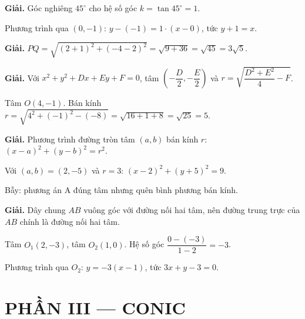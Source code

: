 \documentclass[11pt, a4paper]{article}
\begin{document}
\vspace{0.3cm}
\begin{dapan}[17 — Đáp án B]

\textbf{Giải.} Góc nghiêng $45^\circ$ cho hệ số góc $k = \tan 45^\circ = 1$.

Phương trình qua $(0,-1)$: $y - (-1) = 1 \cdot (x - 0)$, tức $y + 1 = x$.


\end{dapan}
\vspace{0.3cm}
\begin{dapan}[18 — Đáp án A]

\textbf{Giải.} $PQ = \sqrt{(2+1)^2 + (-4-2)^2} = \sqrt{9 + 36} = \sqrt{45} = 3\sqrt{5}$.


\end{dapan}
\vspace{0.3cm}
\begin{dapan}[19 — Đáp án A]

\textbf{Giải.} Với $x^2+y^2+Dx+Ey+F=0$, tâm $\left(-\dfrac{D}{2}, -\dfrac{E}{2}\right)$ và $r = \sqrt{\dfrac{D^2+E^2}{4} - F}$.

Tâm $O(4,-1)$. Bán kính $r = \sqrt{4^2 + (-1)^2 - (-8)} = \sqrt{16+1+8} = \sqrt{25} = 5$.


\end{dapan}
\vspace{0.3cm}
\begin{dapan}[20 — Đáp án C]

\textbf{Giải.} Phương trình đường tròn tâm $(a,b)$ bán kính $r$: $(x-a)^2 + (y-b)^2 = r^2$.

Với $(a,b) = (2,-5)$ và $r = 3$: $(x-2)^2 + (y+5)^2 = 9$.

Bẫy: phương án A đúng tâm nhưng quên bình phương bán kính.


\end{dapan}
\vspace{0.3cm}
\begin{dapan}[21 — Đáp án D]

\textbf{Giải.} Dây chung $AB$ vuông góc với đường nối hai tâm, nên đường trung trực của $AB$ chính là đường nối hai tâm.

Tâm $O_1(2,-3)$, tâm $O_2(1,0)$. Hệ số góc $\dfrac{0-(-3)}{1-2} = -3$.

Phương trình qua $O_2$: $y = -3(x-1)$, tức $3x + y - 3 = 0$.

\section{PHẦN III — CONIC}


\end{dapan}
\end{document}
